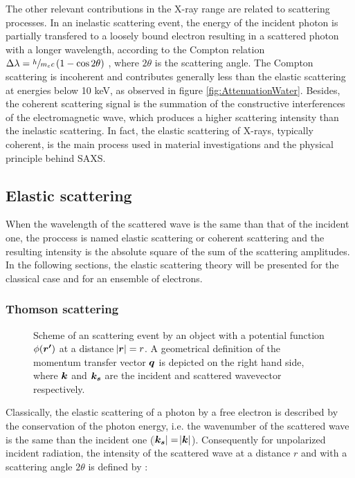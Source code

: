 The other relevant contributions in the X-ray range are related to scattering processes. In an inelastic scattering event, the energy of the incident photon is partially transfered to a loosely bound electron resulting in a scattered photon with a longer wavelength, according to the Compton relation $\Delta\lambda = \sfrac{h}{m_e c}\left( 1 - \cos{2\theta} \right) $ \citep{als-nielsen_elements_2011}, where $2\theta$ is the scattering angle. The Compton scattering is incoherent and contributes generally less than the elastic scattering at energies below 10 keV, as observed in figure \ref{fig:AttenuationWater}. Besides, the coherent scattering signal is the summation of the constructive interferences of the electromagnetic wave, which produces a higher scattering intensity than the inelastic scattering. In fact, the elastic scattering of X-rays, typically coherent, is the main process used in material investigations and the physical principle behind SAXS.

\subsection{Elastic scattering}
\label{sec:ElasticScattering}

When the wavelength of the scattered wave is the same than that of the incident one, the proccess is named elastic scattering or coherent scattering and the resulting intensity is the absolute square of the sum of the scattering amplitudes. In the following sections, the elastic scattering theory will be presented for the classical case and for an ensemble of electrons.

\subsubsection{Thomson scattering}

\begin{figure}%
\centering
\def\svgwidth{0.95\linewidth}

\caption[Schematics of a scattering process and graphical definition of $\vect{q}$.]{Scheme of an scattering event by an object with a potential function $\phi(\bm{r'})$ at a distance $\abs{\bm{r}}=r$. A geometrical definition of the momentum transfer vector $\vect{q}$ is depicted on the right hand side, where $\bm{k}$ and $\bm{k_s}$ are the incident and scattered wavevector respectively.}
\label{fig:FraunhoferScheme}
\end{figure}

Classically, the elastic scattering of a photon by a free electron is described by the conservation of the photon energy, i.e. the wavenumber of the scattered wave is the same than the incident one ($\abs{\bm{k_s}}=\abs{\bm{k}}$). Consequently for unpolarized incident radiation, the intensity of the scattered wave at a distance $r$ and with a scattering angle $2\theta$ is defined by \citep{warren_x-ray_1969}:

